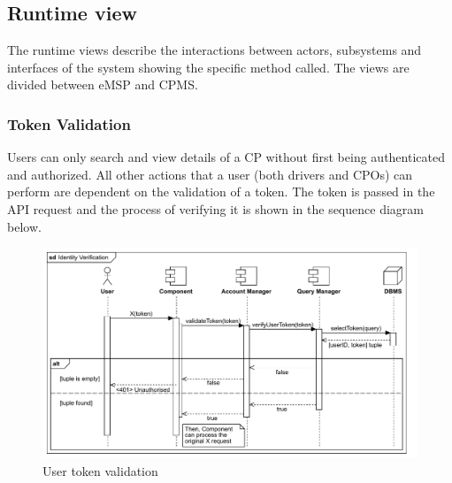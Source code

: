 \pagebreak
\subsection{Runtime view}
The runtime views describe the interactions between actors, subsystems and interfaces of the system showing the specific method called.
The views are divided between eMSP and CPMS.

\subsubsection{Token Validation}
Users can only search and view details of a CP without first being authenticated and authorized. All other actions that a user (both drivers and CPOs) can perform are dependent on the validation of a token. The token is passed in the API request and the process of verifying it is shown in the sequence diagram below.
\begin{figure}[H]
    \centering
    \includegraphics[scale=0.75]{src/runtimeView/auth.pdf}
    \caption{User token validation}
\end{figure}

